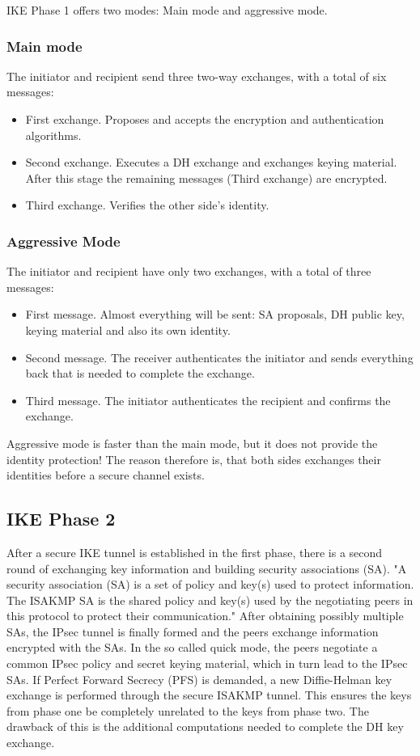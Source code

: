 \documentclass[a4paper]{report}
\begin{document}
IKE Phase 1 offers two modes: Main mode and aggressive mode.
\subsubsection{Main mode}
\label{sssec:Phase1:mainMode}
The initiator and recipient send three two-way exchanges, with a total of six messages:
\begin{itemize}
	\item First exchange. Proposes and accepts the encryption and authentication algorithms.
	\item Second exchange. Executes a DH exchange and exchanges keying material. After this stage  the remaining messages (Third exchange) are encrypted.
	\item Third exchange.  Verifies the other side's identity.
\end{itemize}

\subsubsection{Aggressive Mode}
\label{sssec:Phase1:aggressiveMode}
The initiator and recipient have only two exchanges, with a total of three messages:
\begin{itemize}
	\item First message. Almost everything will be sent: SA proposals, DH public key, keying material and also its own identity.
	\item Second message. The receiver authenticates the initiator and sends everything back that is needed to complete the exchange.
	\item Third message. The initiator authenticates the recipient and confirms the exchange.
\end{itemize}
Aggressive mode is faster than the main mode, but it does not provide the identity protection! The reason therefore is, that both sides exchanges their identities before a secure channel exists. \parencite{JuniperNetworks2016}

\subsection{IKE Phase 2}
\label{ssec:Phase2}
After a secure IKE tunnel is established in the first phase, there is a second round of exchanging key information and building security associations (SA). "A security association (SA) is a set of policy and key(s) used to protect information. The ISAKMP SA is the shared policy and key(s) used by the negotiating peers in this protocol to protect their communication." \parencite{Harkins1998} After obtaining possibly multiple SAs, the IPsec tunnel is finally formed and the peers exchange information encrypted with the SAs. In the so called quick mode, the peers negotiate a common IPsec policy and secret keying material, which in turn lead to the IPsec SAs. If Perfect Forward Secrecy (PFS) is demanded, a new Diffie-Helman key exchange is performed through the secure ISAKMP tunnel. This ensures the keys from phase one be completely unrelated to the keys from phase two. The drawback of this is the additional computations needed to complete the DH key exchange.
\end{document}
